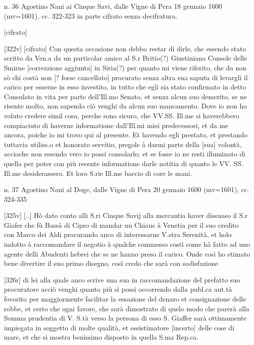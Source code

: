 n. 36  Agostino Nani ai  Cinque Savi, dalle  Vigne di Pera  18 gennaio
1600 (mv=1601), cc. 322-323 in parte cifrato senza decifratura.

[cifrato]

[322v] [cifrato] Con  questa occasione non debbo restar  di dirle, che
essendo stato scritto da Ven.a da un particolar amico al S.r Britio(?)
Giustiniano  Console delle Smirne  [correzzione aggiunta]  in Siria(?)
per quanto  mi viene riferito,  che da non  sò chi costà non  [? forse
  cancellato] procurato  senza altra sua saputa di  levargli il carico
per esserne in esso investito,  in tutto che egli sia stato confirmato
in  detto Consulato  in vita  per parte  dell'Ill.mo Senato,  et senza
alcun suo  demerito, se  ne risente molto,  non sapendo ciò  venghi da
alcun  suo mancamento.   Dove io  non  ho voluto  credere simil  cosa,
perche sono  sicuro, che VV.SS.  Ill.me si  haverebbero compiaciuto di
haverne informatione  dall'Ill.mi miei predecessori, et  da me ancora,
poiche  io mi  trovo qui  al presente.  Et havendo  egli  prestato, et
prestando  tuttavia utiliss.o  et honorato  servitio, pregole  à darmi
parte  della  [sua]  volontà,  accioche  non  essendo  vero  io  possi
consolarlo; et se fosse io ne resti illuminato di quella per poter con
più recente informatione  darle notitia di quanto le  VV.  SS.  Ill.me
desiderassero.  Et loro S.rie Ill.me baccio di core le mani.


n.  37 Agostino  Nani al  Doge, dalle  Vigne di  Pera 20  gennaio 1600
(mv=1601), cc.  324-335

[325v] [..]  Hò dato conto alli S.ri Cinque Savij alla mercantia haver
dissuaso il  S.r Giafer che  fù Bassà di  Cipro di mandar un  Chiaus à
Venetia  per il  suo credito  con Marco  dei Aldi  procurando  anco di
interessarne  V.stra  Serenità,  et  holo indotto  à  raccomandare  il
negotio à  qualche commesso  costì come hà  fatto ad uno  agente delli
Abudenti hebrei che se ne hanno  preso il carico. Onde così ho stimato
bene  divertire  il  suo  primo  disegno,  così  credo  che  sarà  con
sodisfazione

[326r] di  lei alla quale anco  scrive una sua  in raccomandazione del
prefatto suo  procuratore acciò venghi quanto più  si possi occorrendo
dalla publ.ca aut.tà fovorito  per maggiormente facilitar la essazione
del denaro et consignazione delle robbe, et certo che ogni favore, che
sarà  dimostrato di  quelo modo  che  parerà alla  Somma prudentia  di
V. S.tà verso la persona di esso S. Giaffer sarà ottimamente impiegata
in soggetto di molte qualità, et essistimatore [incerto] delle cose di
mare, et che si mostra benissimo disposto in quella S.ma Rep.ca.

